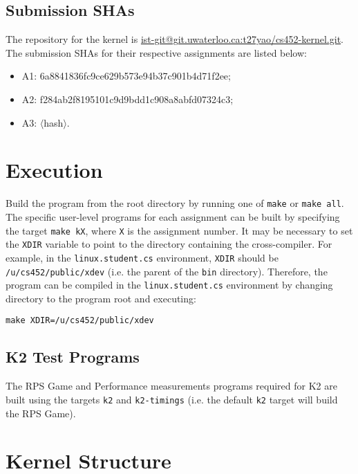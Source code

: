 \documentclass[12pt, titlepage]{article}
\begin{document}
    \subsection{Submission SHAs}

    The repository for the kernel is \href{https://git.uwaterloo.ca/t27yao/cs452-kernel}{ist-git@git.uwaterloo.ca:t27yao/cs452-kernel.git}. The submission SHAs for their respective assignments are listed below:
    \begin{itemize}
        \item A1: 6a8841836fc9ce629b573e94b37c901b4d71f2ee;
        \item A2: f284ab2f8195101c9d9bdd1c908a8abfd07324c3;
        \item A3: $\langle$hash$\rangle$.
    \end{itemize}

    \section{Execution}

    Build the program from the root directory by running one of \verb`make` or \verb`make all`. The specific user-level programs for each assignment can be built by specifying the target \verb`make kX`, where \verb`X` is the assignment number. It may be necessary to set the \verb`XDIR` variable to point to the directory containing the cross-compiler. For example, in the \verb`linux.student.cs` environment, \verb`XDIR` should be \verb`/u/cs452/public/xdev` (i.e. the parent of the \verb`bin` directory). Therefore, the program can be compiled in the \verb`linux.student.cs` environment by changing directory to the program root and executing:
    \begin{verbatim}
make XDIR=/u/cs452/public/xdev
    \end{verbatim}

    \subsection{K2 Test Programs}
    The RPS Game and Performance measurements programs required for K2 are built using the targets \verb`k2` and \verb`k2-timings` (i.e. the default \verb`k2` target will build the RPS Game).

    \section{Kernel Structure}
\end{document}
